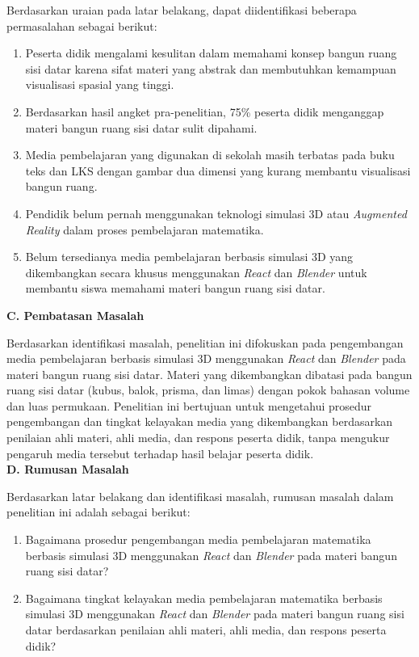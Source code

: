 \hspace*{1cm}Berdasarkan uraian pada latar belakang, dapat diidentifikasi beberapa permasalahan sebagai berikut:
\begin{enumerate}
    \item Peserta didik mengalami kesulitan dalam memahami konsep bangun ruang sisi datar karena sifat materi yang abstrak dan membutuhkan kemampuan visualisasi spasial yang tinggi.
    \item Berdasarkan hasil angket pra-penelitian, 75\% peserta didik menganggap materi bangun ruang sisi datar sulit dipahami.
    \item Media pembelajaran yang digunakan di sekolah masih terbatas pada buku teks dan LKS dengan gambar dua dimensi yang kurang membantu visualisasi bangun ruang.
    \item Pendidik belum pernah menggunakan teknologi simulasi 3D atau \textit{Augmented Reality} dalam proses pembelajaran matematika.
    \item Belum tersedianya media pembelajaran berbasis simulasi 3D yang dikembangkan secara khusus menggunakan \textit{React} dan \textit{Blender} untuk membantu siswa memahami materi bangun ruang sisi datar.
\end{enumerate}

\textbf{C. Pembatasan Masalah}

\hspace*{1cm}Berdasarkan identifikasi masalah, penelitian ini difokuskan pada pengembangan media pembelajaran berbasis simulasi 3D menggunakan \textit{React} dan \textit{Blender} pada materi bangun ruang sisi datar. Materi yang dikembangkan dibatasi pada bangun ruang sisi datar (kubus, balok, prisma, dan limas) dengan pokok bahasan volume dan luas permukaan. Penelitian ini bertujuan untuk mengetahui prosedur pengembangan dan tingkat kelayakan media yang dikembangkan berdasarkan penilaian ahli materi, ahli media, dan respons peserta didik, tanpa mengukur pengaruh media tersebut terhadap hasil belajar peserta didik.\\

\textbf{D. Rumusan Masalah}

\hspace*{1cm}Berdasarkan latar belakang dan identifikasi masalah, rumusan masalah dalam penelitian ini adalah sebagai berikut:
\begin{enumerate}
    \item Bagaimana prosedur pengembangan media pembelajaran matematika berbasis simulasi 3D menggunakan \textit{React} dan \textit{Blender} pada materi bangun ruang sisi datar?
    \item Bagaimana tingkat kelayakan media pembelajaran matematika berbasis simulasi 3D menggunakan \textit{React} dan \textit{Blender} pada materi bangun ruang sisi datar berdasarkan penilaian ahli materi, ahli media, dan respons peserta didik?
\end{enumerate}

